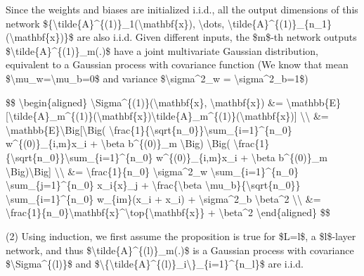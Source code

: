 Since the weights and biases are initialized i.i.d., all the output dimensions of this network \$\{\textbackslash tilde\{A\}\^{}\{(1)\}\_1(\textbackslash mathbf\{x\}), \textbackslash dots, \textbackslash tilde\{A\}\^{}\{(1)\}\_\{n\_1\}(\textbackslash mathbf\{x\})\}\$ are also i.i.d. Given different inputs, the \$m\$-th network outputs \$\textbackslash tilde\{A\}\^{}\{(1)\}\_m(.)\$ have a joint multivariate Gaussian distribution, equivalent to a Gaussian process with covariance function (We know that mean \$\textbackslash mu\_w=\textbackslash mu\_b=0\$ and variance \$\textbackslash sigma\^{}2\_w = \textbackslash sigma\^{}2\_b=1\$)

\$\$ \textbackslash begin\{aligned\} \textbackslash Sigma\^{}\{(1)\}(\textbackslash mathbf\{x\}, \textbackslash mathbf\{x\}\textquotesingle) \&= \textbackslash mathbb\{E\}{[}\textbackslash tilde\{A\}\_m\^{}\{(1)\}(\textbackslash mathbf\{x\})\textbackslash tilde\{A\}\_m\^{}\{(1)\}(\textbackslash mathbf\{x\}\textquotesingle){]} \textbackslash\textbackslash{} \&= \textbackslash mathbb\{E\}\textbackslash Big{[}\textbackslash Big( \textbackslash frac\{1\}\{\textbackslash sqrt\{n\_0\}\}\textbackslash sum\_\{i=1\}\^{}\{n\_0\} w\^{}\{(0)\}\_\{i,m\}x\_i + \textbackslash beta b\^{}\{(0)\}\_m \textbackslash Big) \textbackslash Big( \textbackslash frac\{1\}\{\textbackslash sqrt\{n\_0\}\}\textbackslash sum\_\{i=1\}\^{}\{n\_0\} w\^{}\{(0)\}\_\{i,m\}x\textquotesingle\_i + \textbackslash beta b\^{}\{(0)\}\_m \textbackslash Big)\textbackslash Big{]} \textbackslash\textbackslash{} \&= \textbackslash frac\{1\}\{n\_0\} \textbackslash sigma\^{}2\_w \textbackslash sum\_\{i=1\}\^{}\{n\_0\} \textbackslash sum\_\{j=1\}\^{}\{n\_0\} x\_i\{x\textquotesingle\}\_j + \textbackslash frac\{\textbackslash beta \textbackslash mu\_b\}\{\textbackslash sqrt\{n\_0\}\} \textbackslash sum\_\{i=1\}\^{}\{n\_0\} w\_\{im\}(x\_i + x\textquotesingle\_i) + \textbackslash sigma\^{}2\_b \textbackslash beta\^{}2 \textbackslash\textbackslash{} \&= \textbackslash frac\{1\}\{n\_0\}\textbackslash mathbf\{x\}\^{}\textbackslash top\{\textbackslash mathbf\{x\}\textquotesingle\} + \textbackslash beta\^{}2 \textbackslash end\{aligned\} \$\$

(2) Using induction, we first assume the proposition is true for \$L=l\$, a \$l\$-layer network, and thus \$\textbackslash tilde\{A\}\^{}\{(l)\}\_m(.)\$ is a Gaussian process with covariance \$\textbackslash Sigma\^{}\{(l)\}\$ and \$\textbackslash\{\textbackslash tilde\{A\}\^{}\{(l)\}\_i\textbackslash\}\_\{i=1\}\^{}\{n\_l\}\$ are i.i.d.


